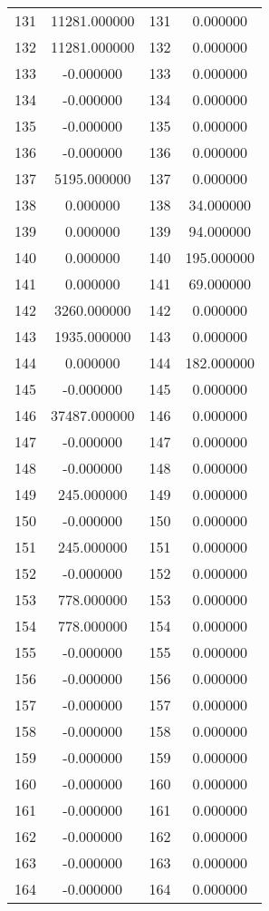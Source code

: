 \documentclass[12pt]{article}
\begin{document}
\begin{longtable}{@{}cccc@{}}
131 & 11281.000000 & 131 & 0.000000 \\
132 & 11281.000000 & 132 & 0.000000 \\
133 & -0.000000 & 133 & 0.000000 \\
134 & -0.000000 & 134 & 0.000000 \\
135 & -0.000000 & 135 & 0.000000 \\
136 & -0.000000 & 136 & 0.000000 \\
137 & 5195.000000 & 137 & 0.000000 \\
138 & 0.000000 & 138 & 34.000000 \\
139 & 0.000000 & 139 & 94.000000 \\
140 & 0.000000 & 140 & 195.000000 \\
141 & 0.000000 & 141 & 69.000000 \\
142 & 3260.000000 & 142 & 0.000000 \\
143 & 1935.000000 & 143 & 0.000000 \\
144 & 0.000000 & 144 & 182.000000 \\
145 & -0.000000 & 145 & 0.000000 \\
146 & 37487.000000 & 146 & 0.000000 \\
147 & -0.000000 & 147 & 0.000000 \\
148 & -0.000000 & 148 & 0.000000 \\
149 & 245.000000 & 149 & 0.000000 \\
150 & -0.000000 & 150 & 0.000000 \\
151 & 245.000000 & 151 & 0.000000 \\
152 & -0.000000 & 152 & 0.000000 \\
153 & 778.000000 & 153 & 0.000000 \\
154 & 778.000000 & 154 & 0.000000 \\
155 & -0.000000 & 155 & 0.000000 \\
156 & -0.000000 & 156 & 0.000000 \\
157 & -0.000000 & 157 & 0.000000 \\
158 & -0.000000 & 158 & 0.000000 \\
159 & -0.000000 & 159 & 0.000000 \\
160 & -0.000000 & 160 & 0.000000 \\
161 & -0.000000 & 161 & 0.000000 \\
162 & -0.000000 & 162 & 0.000000 \\
163 & -0.000000 & 163 & 0.000000 \\
164 & -0.000000 & 164 & 0.000000 \\

\end{longtable}
\end{document}
